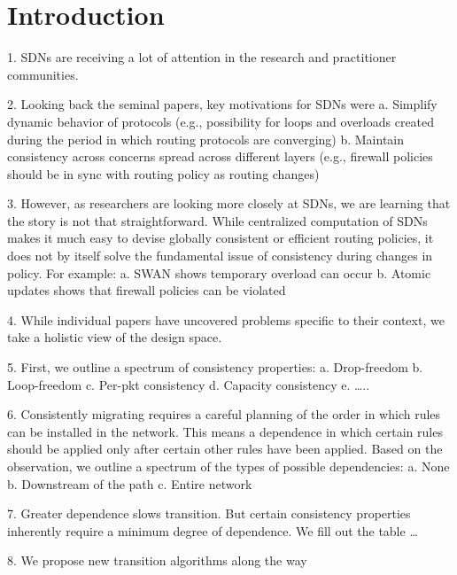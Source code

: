 \section{Introduction}
\label{sec:intro}

1.	SDNs are receiving a lot of attention in the research and practitioner communities.

2.	Looking back the seminal papers, key motivations for SDNs were
a.	Simplify dynamic behavior of protocols (e.g., possibility for loops and overloads created during the period in which routing protocols are converging)
b.	Maintain consistency across concerns spread across different layers (e.g., firewall policies should be in sync with routing policy as routing changes)

3.	However, as researchers are looking more closely at SDNs, we are learning that the story is not that straightforward.  While centralized computation of SDNs makes it much easy to devise globally consistent or efficient routing policies, it does not by itself solve the fundamental issue of consistency during changes in policy.  For example:
a.	SWAN shows temporary overload can occur
b.	Atomic updates shows that firewall policies can be violated

4.	While individual papers have uncovered problems specific to their context, we take a holistic view of the design space.

5.	First, we outline a spectrum of consistency properties:
a.	Drop-freedom
b.	Loop-freedom
c.	Per-pkt consistency
d.	Capacity consistency
e.	…..

6.	Consistently migrating requires a careful planning of the order in which rules can be installed in the network. This means a dependence in which certain rules should be applied only after certain other rules have been applied.  Based on the observation, we outline a spectrum of the types of possible dependencies:
a.	None
b.	Downstream of the path
c.	Entire network

7.	Greater dependence slows transition. But certain consistency properties inherently require a minimum degree of dependence. We fill out the table …

8.	We propose new transition algorithms along the way
